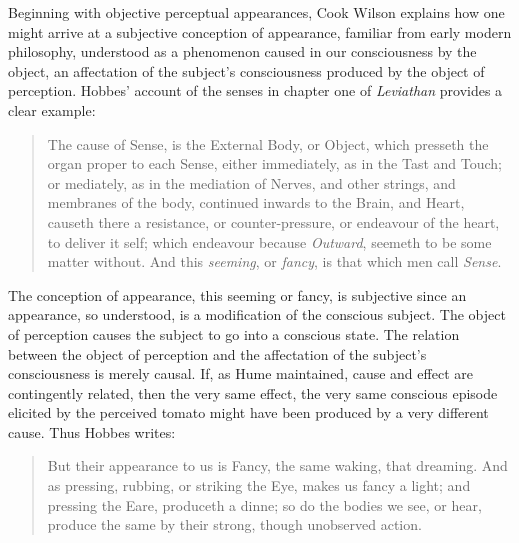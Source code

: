 \documentclass[12pt]{article}
\begin{document}
Beginning with objective perceptual appearances, Cook Wilson explains how one might arrive at a subjective conception of appearance, familiar from early modern philosophy, understood as a phenomenon caused in our consciousness by the object, an affectation of the subject's consciousness produced by the object of perception. Hobbes' account of the senses in chapter one of \emph{Leviathan} provides a clear example:
\begin{quote}
    The cause of Sense, is the External Body, or Object, which presseth the organ proper to each Sense, either immediately, as in the Tast and Touch; or mediately, as in the mediation of Nerves, and other strings, and membranes of the body, continued inwards to the Brain, and Heart, causeth there a resistance, or counter-pressure, or endeavour of the heart, to deliver it self; which endeavour because \emph{Outward}, seemeth to be some matter without. And this \emph{seeming}, or \emph{fancy}, is that which men call \emph{Sense}. \citep[\emph{Leviathan},][\textsc{i}.1]{Hobbes:1651fk}
\end{quote}
The conception of appearance, this seeming or fancy, is subjective since an appearance, so understood, is a modification of the conscious subject. The object of perception causes the subject to go into a conscious state. The relation between the object of perception and the affectation of the subject's consciousness is merely causal. If, as Hume maintained, cause and effect are contingently related, then the very same effect, the very same conscious episode elicited by the perceived tomato might have been produced by a very different cause. Thus Hobbes writes:
\begin{quote}
    But their appearance to us is Fancy, the same waking, that dreaming. And as pressing, rubbing, or striking the Eye, makes us fancy a light; and pressing the Eare, produceth a dinne; so do the bodies we see, or hear, produce the same by their strong, though unobserved action. \citep[\emph{Leviathan},][\textsc{i}.1]{Hobbes:1651fk}
\end{quote}
\end{document}
